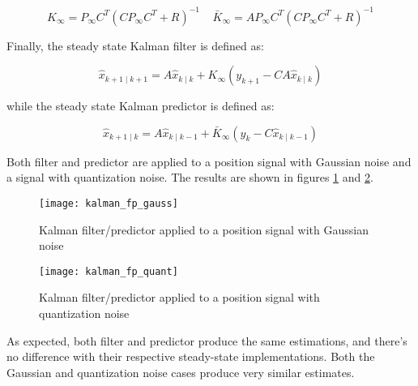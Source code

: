 \begin{equation*}
K_\infty = P_\infty C^T(CP_\infty C^T+R)^{-1}\;\;\;\;\bar K_\infty = AP_\infty C^T(CP_\infty C^T+R)^{-1}
\end{equation*}

Finally, the steady state Kalman filter is defined as:

\begin{equation*}
\hat x_{k+1\mid k+1}=A\hat x_{k\mid k}+K_\infty(y_{k+1}-CA\hat x_{k\mid k})
\end{equation*}

while the steady state Kalman predictor is defined as:

\begin{equation*}
\hat x_{k+1\mid k}=A\hat x_{k\mid k-1}+\bar K_\infty(y_{k}-C\hat x_{k\mid k-1})
\end{equation*}

Both filter and predictor are applied to a position signal with Gaussian noise and a signal with quantization noise. The results are shown in figures \ref{fig:kalman_fp_gauss} and \ref{fig:kalman_fp_quant}.

\begin{figure}[H]
\centering
\texttt{[image: kalman\_fp\_gauss]}
\caption{Kalman filter/predictor applied to a position signal with Gaussian noise}
\label{fig:kalman_fp_gauss}
\end{figure}

\begin{figure}[H]
\centering
\texttt{[image: kalman\_fp\_quant]}
\caption{Kalman filter/predictor applied to a position signal with quantization noise}
\label{fig:kalman_fp_quant}
\end{figure}

As expected, both filter and predictor produce the same estimations, and there's no difference with their respective steady-state implementations. Both the Gaussian and quantization noise cases produce very similar estimates.